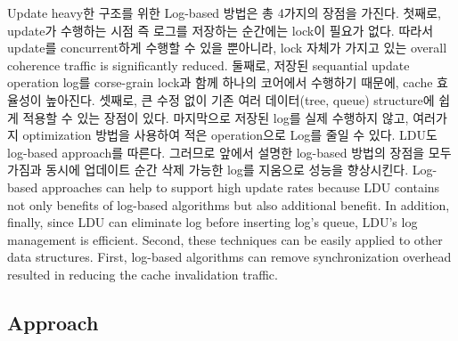 %
\ifkor
Update heavy한 구조를 위한 Log-based 방법은 총 4가지의 장점을 가진다. 
첫째로, update가 수행하는 시점 즉 로그를 저장하는 순간에는 lock이 필요가 없다. 
따라서 update를 concurrent하게 수행할 수 있을 뿐아니라, lock 자체가 가지고 있는 overall
coherence traffic is significantly reduced.
둘째로, 저장된 sequantial update operation log를 corse-grain lock과 함께 하나의 코어에서 수행하기
때문에, cache 효율성이 높아진다.
셋째로, 큰 수정 없이 기존 여러 데이터(tree, queue) structure에 쉽게 적용할 수 있는 장점이 있다.
마지막으로 저장된 log를 실제 수행하지 않고, 여러가지 optimization 방법을 사용하여 적은 operation으로 Log를 줄일 수
있다. 
LDU도 log-based approach를 따른다. 그러므로 앞에서 설명한 log-based 방법의 장점을 모두 가짐과 동시에
업데이트 순간 삭제 가능한 log를 지움으로 성능을 향상시킨다.
\else
Log-based approaches can help to support high update rates because
LDU contains not only benefits of log-based algorithms but also additional benefit.
In addition, finally, since LDU can eliminate log before inserting log's queue,
LDU's log management is efficient.
Second, these techniques can be easily applied to other data structures.
First, log-based algorithms can remove synchronization overhead resulted in
reducing the cache invalidation traffic.
\fi


\subsection{Approach}


